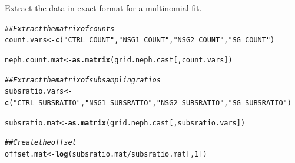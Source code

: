 \documentclass[12pt]{article}\usepackage[]{graphicx}\usepackage[]{color}
\makeatletter
\newcommand{\hlnum}[1]{\textcolor[rgb]{0.686,0.059,0.569}{#1}}%
\newcommand{\hlstr}[1]{\textcolor[rgb]{0.192,0.494,0.8}{#1}}%
\newcommand{\hlcom}[1]{\textcolor[rgb]{0.678,0.584,0.686}{\textit{#1}}}%
\newcommand{\hlopt}[1]{\textcolor[rgb]{0,0,0}{#1}}%
\newcommand{\hlstd}[1]{\textcolor[rgb]{0.345,0.345,0.345}{#1}}%
\newcommand{\hlkwb}[1]{\textcolor[rgb]{0.69,0.353,0.396}{#1}}%
\newcommand{\hlkwd}[1]{\textcolor[rgb]{0.737,0.353,0.396}{\textbf{#1}}}%
\newenvironment{kframe}{%
 \def\at@end@of@kframe{}%
 \ifinner\ifhmode%
  \def\at@end@of@kframe{\end{minipage}}%
  \begin{minipage}{\columnwidth}%
 \fi\fi%
 \def\FrameCommand##1{\hskip\@totalleftmargin \hskip-\fboxsep
 \colorbox{shadecolor}{##1}\hskip-\fboxsep
     \hskip-\linewidth \hskip-\@totalleftmargin \hskip\columnwidth}%
 \MakeFramed {\advance\hsize-\width
   \@totalleftmargin\z@ \linewidth\hsize
   \@setminipage}}%
 {\par\unskip\endMakeFramed%
 \at@end@of@kframe}
\newenvironment{knitrout}{}{} %
\makeatother
\begin{document}
Extract the data in exact format for a multinomial fit.  

\begin{knitrout}\footnotesize
{}\color{fgcolor}\begin{kframe}
\begin{alltt}
\hlcom{## Extract the matrix of counts}
\hlstd{count.vars} \hlkwb{<-} \hlkwd{c}\hlstd{(}\hlstr{"CTRL_COUNT"}\hlstd{,} \hlstr{"NSG1_COUNT"}\hlstd{,} \hlstr{"NSG2_COUNT"}\hlstd{,} \hlstr{"SG_COUNT"}\hlstd{)}

\hlstd{neph.count.mat} \hlkwb{<-} \hlkwd{as.matrix}\hlstd{(grid.neph.cast[, count.vars])}

\hlcom{## Extract the matrix of subsampling ratios}
\hlstd{subsratio.vars} \hlkwb{<-} \hlkwd{c}\hlstd{(}\hlstr{"CTRL_SUBSRATIO"}\hlstd{,} \hlstr{"NSG1_SUBSRATIO"}\hlstd{,} \hlstr{"NSG2_SUBSRATIO"}\hlstd{,} \hlstr{"SG_SUBSRATIO"}\hlstd{)}

\hlstd{subsratio.mat} \hlkwb{<-} \hlkwd{as.matrix}\hlstd{(grid.neph.cast[, subsratio.vars])}

\hlcom{## Create the offset}
\hlstd{offset.mat} \hlkwb{<-} \hlkwd{log}\hlstd{(subsratio.mat} \hlopt{/} \hlstd{subsratio.mat[,}\hlnum{1}\hlstd{])}
\end{alltt}
\end{kframe}
\end{knitrout}
\end{document}
